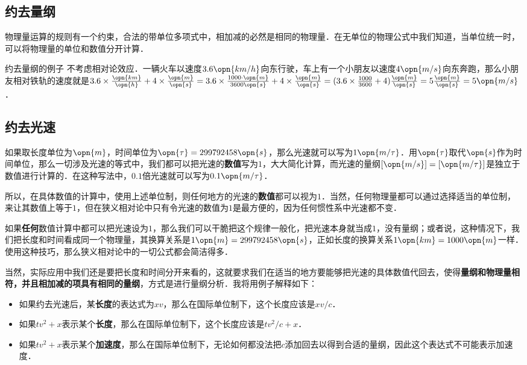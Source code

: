 
\subsection{约去量纲}

物理量运算的规则有一个约束，合法的带单位多项式中，相加减的必然是相同的物理量．在无单位的物理公式中我们知道，当单位统一时，可以将物理量的单位和数值分开计算．

\begin{example}{约去量纲的例子}
不考虑相对论效应．一辆火车以速度$3.6\opn{km/h}$向东行驶，车上有一个小朋友以速度$4\opn{m/s}$向东奔跑，那么小朋友相对铁轨的速度就是$3.6\times\frac{\opn{km}}{\opn{h}}+4\times\frac{\opn{m}}{\opn{s}}=3.6\times\frac{1000\cdot \opn{m}}{3600\opn{s}}+4\times\frac{\opn{m}}{\opn{s}}=(3.6\times\frac{1000}{3600}+4)\frac{\opn{m}}{\opn{s}}=5\frac{\opn{m}}{\opn{s}}=5\opn{m/s}$．
\end{example}

\subsection{约去光速}

如果取长度单位为$\opn{m}$，时间单位为$\opn{\tau}=299792458\opn{s}$，那么光速就可以写为$1\opn{m/\tau}$．用$\opn{\tau}$取代$\opn{s}$作为时间单位，那么一切涉及光速的等式中，我们都可以把光速的\textbf{数值}写为$1$，大大简化计算，而光速的量纲$[\opn{m/s}]=[\opn{m/\tau}]$是独立于数值进行计算的．在这种写法中，$0.1$倍光速就可以写为$0.1\opn{m/\tau}$．

所以，在具体数值的计算中，使用上述单位制，则任何地方的光速的\textbf{数值}都可以视为$1$．当然，任何物理量都可以通过选择适当的单位制，来让其数值上等于$1$，但在狭义相对论中只有令光速的数值为$1$是最方便的，因为任何惯性系中光速都不变．

如果\textbf{任何}数值计算中都可以把光速设为$1$，那么我们可以干脆把这个规律一般化，把光速本身就当成$1$，没有量纲；或者说，这种情况下，我们把长度和时间看成同一个物理量，其换算关系是$1\opn{m}=299792458\opn{s}$，正如长度的换算关系$1\opn{km}=1000\opn{m}$一样．使用这种技巧，那么狭义相对论中的一切公式都会简洁得多．

当然，实际应用中我们还是要把长度和时间分开来看的，这就要求我们在适当的地方要能够把光速的具体数值代回去，使得\textbf{量纲和物理量相符，并且相加减的项具有相同的量纲}，方式是进行量纲分析．我将用例子解释如下：

\begin{example}{}
\begin{itemize}
\item 如果约去光速后，某\textbf{长度}的表达式为$xv$，那么在国际单位制下，这个长度应该是$xv/c$．
\item 如果$tv^2+x$表示某个\textbf{长度}，那么在国际单位制下，这个长度应该是$tv^2/c+x$．
\item 如果$tv^2+x$表示某个\textbf{加速度}，那么在国际单位制下，无论如何都没法把$c$添加回去以得到合适的量纲，因此这个表达式不可能表示加速度．

\end{itemize}
\end{example}

